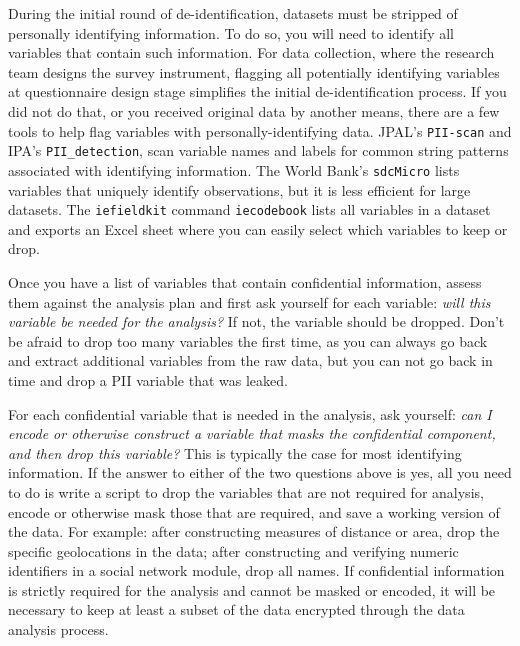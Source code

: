 During the initial round of de-identification, 
datasets must be stripped of personally identifying information.
To do so, you will need to identify all variables that contain
such information.
For data collection, where the research team designs the survey instrument,
flagging all potentially identifying variables at questionnaire design stage
simplifies the initial de-identification process.
If you did not do that, or you received original data by another means,
there are a few tools to help flag variables with personally-identifying data.
JPAL's \texttt{PII-scan} and
IPA's \texttt{PII\_detection}, 
scan variable names and labels for common string patterns associated with identifying information.
The World Bank's \texttt{sdcMicro}
lists variables that uniquely identify observations, 
but it is less efficient for large datasets.
The \texttt{iefieldkit} command \texttt{iecodebook}
lists all variables in a dataset and exports an Excel sheet
where you can easily select which variables to keep or drop.

Once you have a list of variables that contain confidential information,
assess them against the analysis plan and first ask yourself for each variable:
\textit{will this variable be needed for the analysis?}
If not, the variable should be dropped.
Don't be afraid to drop too many variables the first time,
as you can always go back and extract additional variables from the raw data,
but you can not go back in time and drop a PII variable that was leaked.

For each confidential variable that is needed in the analysis, ask yourself:
\textit{can I encode or otherwise construct a variable that masks the confidential component, and
	then drop this variable?}
This is typically the case for most identifying information.
If the answer to either of the two questions above is yes,
all you need to do is write a script to drop the variables that are not required for analysis,
encode or otherwise mask those that are required,
and save a working version of the data.
For example:
after constructing measures of distance or area,
drop the specific geolocations in the data; 
after constructing and verifying numeric identifiers in 
a social network module, drop all names. 
If confidential information is strictly required for the analysis and cannot be
masked or encoded,
it will be necessary to keep at least a subset of the data encrypted through
the data analysis process.

